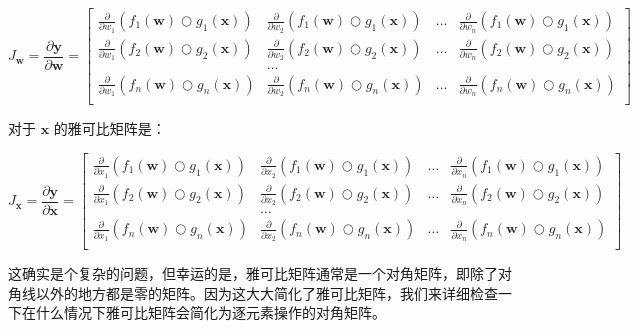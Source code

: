 \documentclass[lang=cn,newtx,10pt,scheme=chinese]{elegantbook}
\begin{document}
\[J_\mathbf{w} = 
\frac{\partial \mathbf{y}}{\partial \mathbf{w}}  = \begin{bmatrix}
\frac{\partial}{\partial w_1} ( f_{1}(\mathbf{w}) \bigcirc g_{1}(\mathbf{x}) ) & \frac{\partial}{\partial w_2} ( f_{1}(\mathbf{w}) \bigcirc g_{1}(\mathbf{x}) ) & \ldots & \frac{\partial}{\partial w_n} ( f_{1}(\mathbf{w}) \bigcirc g_{1}(\mathbf{x}) )\\
\frac{\partial}{\partial w_1} ( f_{2}(\mathbf{w}) \bigcirc g_{2}(\mathbf{x}) ) & \frac{\partial}{\partial w_2} ( f_{2}(\mathbf{w}) \bigcirc g_{2}(\mathbf{x}) ) & \ldots & \frac{\partial}{\partial w_n} ( f_{2}(\mathbf{w}) \bigcirc g_{2}(\mathbf{x}) )\\
& \ldots\\
\frac{\partial}{\partial w_1} ( f_{n}(\mathbf{w}) \bigcirc g_{n}(\mathbf{x}) ) & \frac{\partial}{\partial w_2} ( f_{n}(\mathbf{w}) \bigcirc g_{n}(\mathbf{x}) ) & \ldots & \frac{\partial}{\partial w_n} ( f_{n}(\mathbf{w}) \bigcirc g_{n}(\mathbf{x}) )\\
\end{bmatrix}\]

对于 $\mathbf{x}$ 的雅可比矩阵是：

\[J_\mathbf{x} = 
\frac{\partial \mathbf{y}}{\partial \mathbf{x}}  = \begin{bmatrix}
\frac{\partial}{\partial x_1} ( f_{1}(\mathbf{w}) \bigcirc g_{1}(\mathbf{x}) ) & \frac{\partial}{\partial x_2} ( f_{1}(\mathbf{w}) \bigcirc g_{1}(\mathbf{x}) ) & \ldots & \frac{\partial}{\partial x_n} ( f_{1}(\mathbf{w}) \bigcirc g_{1}(\mathbf{x}) )\\
\frac{\partial}{\partial x_1} ( f_{2}(\mathbf{w}) \bigcirc g_{2}(\mathbf{x}) ) & \frac{\partial}{\partial x_2} ( f_{2}(\mathbf{w}) \bigcirc g_{2}(\mathbf{x}) ) & \ldots & \frac{\partial}{\partial x_n} ( f_{2}(\mathbf{w}) \bigcirc g_{2}(\mathbf{x}) )\\
& \ldots\\
\frac{\partial}{\partial x_1} ( f_{n}(\mathbf{w}) \bigcirc g_{n}(\mathbf{x}) ) & \frac{\partial}{\partial x_2} ( f_{n}(\mathbf{w}) \bigcirc g_{n}(\mathbf{x}) ) & \ldots & \frac{\partial}{\partial x_n} ( f_{n}(\mathbf{w}) \bigcirc g_{n}(\mathbf{x}) )\\
\end{bmatrix}\]

这确实是个复杂的问题，但幸运的是，雅可比矩阵通常是一个对角矩阵，即除了对角线以外的地方都是零的矩阵。因为这大大简化了雅可比矩阵，我们来详细检查一下在什么情况下雅可比矩阵会简化为逐元素操作的对角矩阵。
\end{document}
